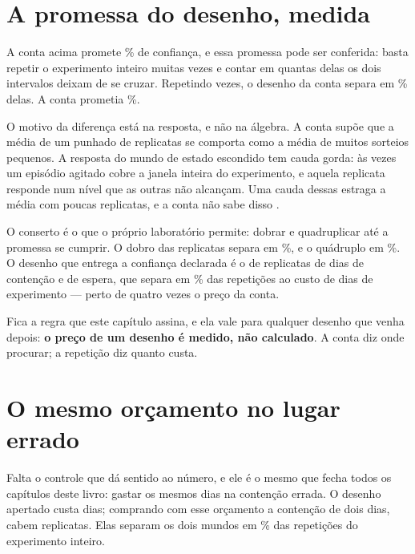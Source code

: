 \section{A promessa do desenho, medida}

A conta acima promete \numDesenhoConfiancaPct\% de confiança, e essa promessa pode ser conferida:
basta repetir o experimento inteiro muitas vezes e contar em quantas delas os dois intervalos
deixam de se cruzar. Repetindo \numDesenhoMeta{} vezes, o desenho da conta separa em
\numDesenhoSeparaPlanejadaPct\% delas. A conta prometia \numDesenhoConfiancaPct\%.

O motivo da diferença está na resposta, e não na álgebra. A conta supõe que a média de um punhado
de replicatas se comporta como a média de muitos sorteios pequenos. A resposta do mundo de estado
escondido tem cauda gorda: às vezes um episódio agitado cobre a janela inteira do experimento, e
aquela replicata responde num nível que as outras não alcançam. Uma cauda dessas estraga a média
com poucas replicatas, e a conta não sabe disso \cite{taleb2020much}.

O conserto é o que o próprio laboratório permite: dobrar e quadruplicar até a promessa se cumprir.
O dobro das replicatas separa em \numDesenhoSeparaDobroPct\%, e o quádruplo em
\numDesenhoSeparaQuadruploPct\%. O desenho que entrega a confiança declarada é o de
\numDesenhoEntregueReplicatas{} replicatas de \numDesenhoApertadoContensao{} dias de contenção e
\numDesenhoEspera{} de espera, que separa em \numDesenhoEntreguePct\% das repetições ao custo de
\numDesenhoEntregueDias{} dias de experimento ---
perto de quatro vezes o preço da conta.

Fica a regra que este capítulo assina, e ela vale para qualquer desenho que venha depois:
\textbf{o preço de um desenho é medido, não calculado}. A conta diz onde procurar; a repetição diz
quanto custa.

\section{O mesmo orçamento no lugar errado}

Falta o controle que dá sentido ao número, e ele é o mesmo que fecha todos os capítulos deste
livro: gastar os mesmos dias na contenção errada. O desenho apertado custa
\numDesenhoApertadoDias{} dias; comprando com esse orçamento a contenção de dois dias, cabem
\numDesenhoMesmaContaReplicatas{} replicatas. Elas separam os dois mundos em
\numDesenhoSeparaCurtaPct\% das repetições do experimento inteiro.


